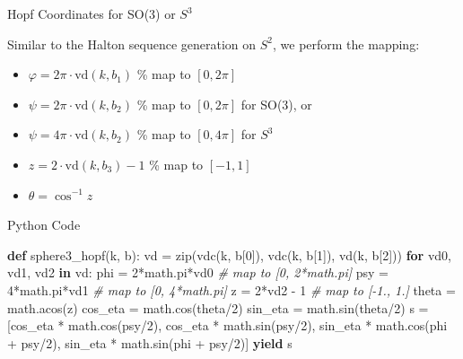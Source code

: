 \documentclass[10pt,ignorenonframetext,serif,onlymath]{beamer}
\newenvironment{Shaded}{}{}
\newcommand{\BuiltInTok}[1]{#1}
\newcommand{\CommentTok}[1]{\textcolor[rgb]{0.38,0.63,0.69}{\textit{#1}}}
\newcommand{\ControlFlowTok}[1]{\textcolor[rgb]{0.00,0.44,0.13}{\textbf{#1}}}
\newcommand{\DecValTok}[1]{\textcolor[rgb]{0.25,0.63,0.44}{#1}}
\newcommand{\KeywordTok}[1]{\textcolor[rgb]{0.00,0.44,0.13}{\textbf{#1}}}
\newcommand{\NormalTok}[1]{#1}
\newcommand{\OperatorTok}[1]{\textcolor[rgb]{0.40,0.40,0.40}{#1}}
\begin{document}
\begin{frame}{Hopf Coordinates for SO(3) or \(S^3\)}
\protect\hypertarget{hopf-coordinates-for-so3-or-s3}{}

Similar to the Halton sequence generation on \(S^2\), we perform the
mapping:

\begin{itemize}
\item
  \(\varphi = 2\pi\cdot\mathrm{vd}(k,b_1)\) \% map to \([0,2\pi]\)
\item
  \(\psi = 2\pi\cdot\mathrm{vd}(k,b_2)\) \% map to \([0,2\pi]\) for
  SO(3), or
\item
  \(\psi = 4\pi\cdot\mathrm{vd}(k,b_2)\) \% map to \([0,4\pi]\) for
  \(S^3\)
\item
  \(z = 2\cdot\mathrm{vd}(k,b_3) - 1\) \% map to \([-1,1]\)
\item
  \(\theta = \cos^{-1}z\)
\end{itemize}

\end{frame}

\begin{frame}[fragile]{Python Code}
\protect\hypertarget{python-code}{}

\scriptsize

\begin{Shaded}
\begin{Highlighting}[]
\KeywordTok{def}\NormalTok{ sphere3_hopf(k, b):}
\NormalTok{    vd }\OperatorTok{=} \BuiltInTok{zip}\NormalTok{(vdc(k, b[}\DecValTok{0}\NormalTok{]), vdc(k, b[}\DecValTok{1}\NormalTok{]), vd(k, b[}\DecValTok{2}\NormalTok{]))}
    \ControlFlowTok{for}\NormalTok{ vd0, vd1, vd2 }\KeywordTok{in}\NormalTok{ vd:}
\NormalTok{        phi }\OperatorTok{=} \DecValTok{2}\OperatorTok{*}\NormalTok{math.pi}\OperatorTok{*}\NormalTok{vd0   }\CommentTok{# map to [0, 2*math.pi]}
\NormalTok{        psy }\OperatorTok{=} \DecValTok{4}\OperatorTok{*}\NormalTok{math.pi}\OperatorTok{*}\NormalTok{vd1   }\CommentTok{# map to [0, 4*math.pi]}
\NormalTok{        z }\OperatorTok{=} \DecValTok{2}\OperatorTok{*}\NormalTok{vd2 }\OperatorTok{-} \DecValTok{1}         \CommentTok{# map to [-1., 1.]}
\NormalTok{        theta }\OperatorTok{=}\NormalTok{ math.acos(z)}
\NormalTok{        cos_eta }\OperatorTok{=}\NormalTok{ math.cos(theta}\OperatorTok{/}\DecValTok{2}\NormalTok{)}
\NormalTok{        sin_eta }\OperatorTok{=}\NormalTok{ math.sin(theta}\OperatorTok{/}\DecValTok{2}\NormalTok{)}
\NormalTok{        s }\OperatorTok{=}\NormalTok{ [cos_eta }\OperatorTok{*}\NormalTok{ math.cos(psy}\OperatorTok{/}\DecValTok{2}\NormalTok{),}
\NormalTok{             cos_eta }\OperatorTok{*}\NormalTok{ math.sin(psy}\OperatorTok{/}\DecValTok{2}\NormalTok{),}
\NormalTok{             sin_eta }\OperatorTok{*}\NormalTok{ math.cos(phi }\OperatorTok{+}\NormalTok{ psy}\OperatorTok{/}\DecValTok{2}\NormalTok{),}
\NormalTok{             sin_eta }\OperatorTok{*}\NormalTok{ math.sin(phi }\OperatorTok{+}\NormalTok{ psy}\OperatorTok{/}\DecValTok{2}\NormalTok{)]}
        \ControlFlowTok{yield}\NormalTok{ s}
\end{Highlighting}
\end{Shaded}

\end{frame}
\end{document}
